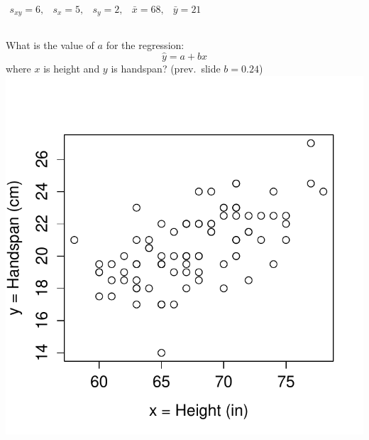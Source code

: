 \documentclass[handout]{beamer}
\begin{document}
\begin{frame}
$\begin{array}{ccccc} s_{xy} = 6,&s_x = 5,& s_y = 2,& \bar{x} = 68,& \bar{y} = 21\end{array}$
\begin{columns}[c]
\column{2.5in}
What is the value of $a$ for the regression: $$\hat{y}=a+bx$$
where $x$ is height and $y$ is handspan? (prev.\ slide $b = 0.24$)
\column{1.8in}
\includegraphics[scale = 0.4]{./images/height_handspan1}
\end{columns}
\alert{$$\phantom{a = \bar{y} - b \bar{x} = 20.6 - 0.297 \times 67.6 \approx 0.5}$$}
\end{frame}
\end{document}
